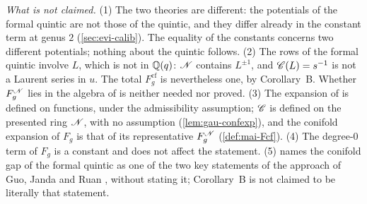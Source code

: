 \begin{rmk}
\emph{What is not claimed.} (1) The two theories are different: the potentials of the formal quintic are not those of the quintic, and they differ already in the constant term at genus $2$ (\cref{sec:evi-calib}). The equality of the constants concerns two different potentials; nothing about the quintic follows. (2) The rows of the formal quintic involve $L$, which is not in $\mathbb{Q}(q)$: $\mathscr{N}$ contains $L^{\pm1}$, and $\mathscr{C}(L)=s^{-1}$ is not a Laurent series in $u$. The total $F_g^{\mathrm{cf}}$ is nevertheless one, by Corollary~B. Whether $F_g^{\mathscr{N}}$ lies in the algebra of \cite[Def.~1.1]{CGYZ26} is neither needed nor proved. (3) The expansion of \cite{CGYZ26} is defined on functions, under the admissibility assumption; $\mathscr{C}$ is defined on the presented ring $\mathscr{N}$, with no assumption (\cref{lem:gau-confexp}), and the conifold expansion of $F_g$ is that of its representative $F_g^{\mathscr{N}}$ (\cref{def:mai-Fcf}). (4) The degree-$0$ term of $F_g$ is a constant and does not affect the statement. (5) \cite[Rem.~1.9]{CGYZ26} names the conifold gap of the formal quintic as one of the two key statements of the approach of Guo, Janda and Ruan \cite{GJR18}, without stating it; Corollary~B is not claimed to be literally that statement.
\end{rmk}


